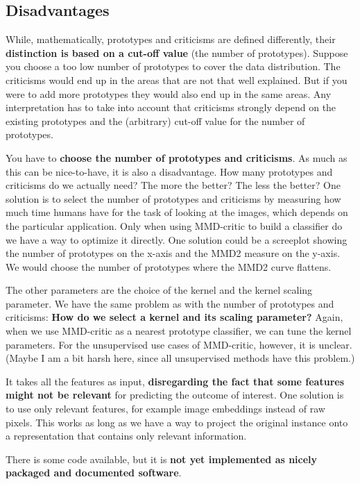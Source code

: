 \documentclass[
  12pt,
]{krantz}
\begin{document}
\hypertarget{disadvantages-11}{%
\subsection{Disadvantages}\label{disadvantages-11}}

While, mathematically, prototypes and criticisms are defined differently, their \textbf{distinction is based on a cut-off value} (the number of prototypes).
Suppose you choose a too low number of prototypes to cover the data distribution.
The criticisms would end up in the areas that are not that well explained.
But if you were to add more prototypes they would also end up in the same areas.
Any interpretation has to take into account that criticisms strongly depend on the existing prototypes and the (arbitrary) cut-off value for the number of prototypes.

You have to \textbf{choose the number of prototypes and criticisms}.
As much as this can be nice-to-have, it is also a disadvantage.
How many prototypes and criticisms do we actually need?
The more the better? The less the better?
One solution is to select the number of prototypes and criticisms by measuring how much time humans have for the task of looking at the images, which depends on the particular application.
Only when using MMD-critic to build a classifier do we have a way to optimize it directly.
One solution could be a screeplot showing the number of prototypes on the x-axis and the MMD2 measure on the y-axis.
We would choose the number of prototypes where the MMD2 curve flattens.

The other parameters are the choice of the kernel and the kernel scaling parameter.
We have the same problem as with the number of prototypes and criticisms:
\textbf{How do we select a kernel and its scaling parameter?}
Again, when we use MMD-critic as a nearest prototype classifier, we can tune the kernel parameters.
For the unsupervised use cases of MMD-critic, however, it is unclear.
(Maybe I am a bit harsh here, since all unsupervised methods have this problem.)

It takes all the features as input, \textbf{disregarding the fact that some features might not be relevant} for predicting the outcome of interest.
One solution is to use only relevant features, for example image embeddings instead of raw pixels.
This works as long as we have a way to project the original instance onto a representation that contains only relevant information.

There is some code available, but it is \textbf{not yet implemented as nicely packaged and documented software}.
\end{document}
